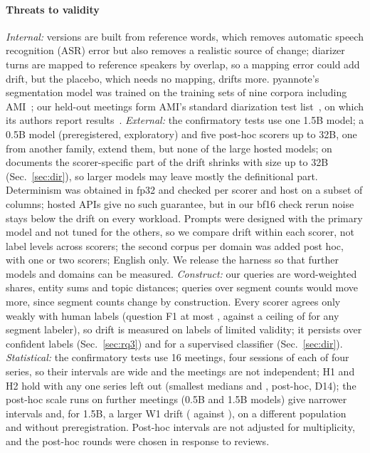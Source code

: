 \documentclass[conference]{IEEEtran}
\begin{document}
\paragraph*{Threats to validity} \emph{Internal:} versions are built from reference words, which removes automatic speech recognition (ASR) error but
also removes a realistic source of change; diarizer turns are mapped to reference speakers by overlap, so a mapping
error could add drift, but the placebo, which needs no mapping, drifts more. pyannote's segmentation model was trained
on the training sets of nine corpora including AMI~\cite{segcard}; our held-out meetings form AMI's standard
diarization test list~\cite{amisetup}, on which its authors report results~\cite{bredin23}. \emph{External:} the
confirmatory tests use one 1.5B model; a 0.5B model (preregistered, exploratory) and five post-hoc scorers up to 32B,
one from another family, extend them, but none of the large hosted models; on documents the scorer-specific part
of the drift shrinks with size up to 32B (Sec.~\ref{sec:dir}), so larger models may leave mostly the definitional part.
Determinism was obtained in fp32 and checked per scorer and host on a subset of columns; hosted APIs give no such
guarantee, but in our bf16 check rerun noise stays below the drift on every workload. Prompts were designed with the primary model
and not tuned for the others, so we compare drift within each scorer, not label levels across scorers;
the second corpus per domain was added post hoc, with one or two scorers; English only. We release the harness so that further models and domains can be measured.
\emph{Construct:} our queries are word-weighted shares, entity sums and topic distances;
queries over segment counts would move more, since segment counts change by construction. Every scorer agrees only
weakly with human labels (question F1 at most \nGoldQumanualfoneMseven, against a ceiling of \nCeilQu{} for any
segment labeler), so drift is measured on labels of limited validity; it persists over confident labels
(Sec.~\ref{sec:rq3}) and for a supervised classifier (Sec.~\ref{sec:dir}). \emph{Statistical:} the confirmatory
tests use 16 meetings, four sessions of each of four series, so their intervals are wide and the meetings are not
independent; H1 and H2 hold with any one series left out (smallest medians \nLosoHoneMin{} and \nLosoHtwoMin, post-hoc,
D14); the post-hoc scale runs on \nScaleN{} further meetings (0.5B and
1.5B models) give narrower intervals and, for 1.5B, a larger W1 drift (\nScalePWoneQonemed{} against \nHonemed), on a
different population and without preregistration. Post-hoc intervals are not adjusted for multiplicity, and the
post-hoc rounds were chosen in response to reviews.
\end{document}
